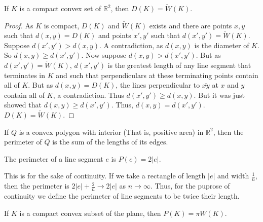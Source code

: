 \documentclass[crop=false,class=book,oneside]{standalone}
\begin{document}
            \begin{theorem}
            If $K$ is a compact convex set of $\mathbb{R}^2$, then $D(K) = \check{W}(K)$.
            \end{theorem}
            \begin{proof}
            As $K$ is compact, $D(K)$ and $\check{W}(K)$ exists and there are points $x,y$ such that $d(x,y) = D(K)$ and points $x',y'$ such that $d(x',y') = \check{W}(K)$. Suppose $d(x',y')> d(x,y)$. A contradiction, as $d(x,y)$ is the diameter of $K$. So $d(x,y) \geq d(x',y')$. Now suppose $d(x,y)>d(x',y')$. But as $d(x',y')= \check{W}(K)$, $d(x',y')$ is the greatest length of any line segment that terminates in $K$ and such that perpendiculars at these terminating points contain all of $K$. But as $d(x,y)=D(K)$, the lines perpendicular to $\overline{xy}$ at $x$ and $y$ contain all of $K$, a contradiction. Thus $d(x',y') \geq d(x,y)$. But it was just showed that $d(x,y)\geq d(x',y')$. Thus, $d(x,y) = d(x',y')$. $D(K) = \check{W}(K)$.
            \end{proof}
            \begin{definition}
            If $Q$ is a convex polygon with interior (That is, positive area) in $\mathbb{R}^2$, then the perimeter of $Q$ is the sum of the lengths of its edges. 
            \end{definition}
            \begin{definition}
            The perimeter of a line segment $e$ is $P(e) = 2|e|$.
            \end{definition}
            \begin{remark}
            This is for the sake of continuity. If we take a rectangle of length $|e|$ and width $\frac{1}{n}$, then the perimeter is $2|e|+\frac{2}{n} \rightarrow 2|e|$ as $n\rightarrow \infty$. Thus, for the puprose of continuity we define the perimeter of line segments to be twice their length.
            \end{remark}
            \begin{theorem}
            If $K$ is a compact convex subset of the plane, then $P(K) = \pi W(K)$.
            \end{theorem}
\end{document}
